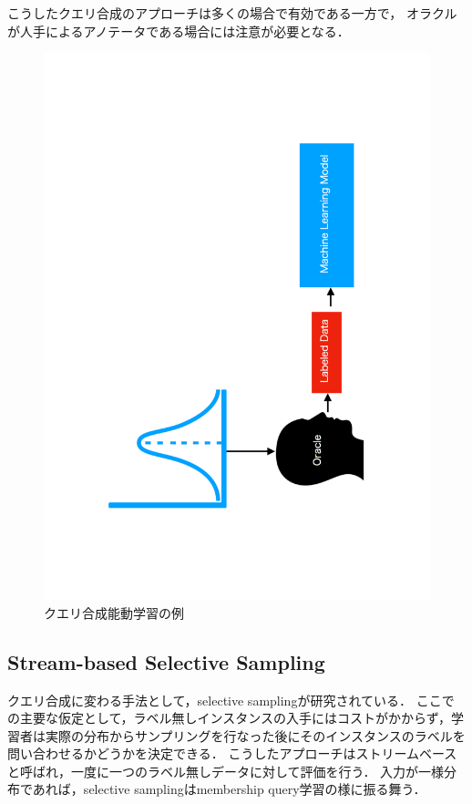 \documentclass[11pt]{report}
\begin{document}
こうしたクエリ合成のアプローチは多くの場合で有効である一方で，
オラクルが人手によるアノテータである場合には注意が必要となる\cite{baum1992query}．

\begin{figure}[h]
\begin{center}
\includegraphics[bb=0 0 500 850, scale=0.4, angle=270]{./images/fig3.pdf}
\vspace{5mm}
\caption{クエリ合成能動学習の例}
\label{fig3}
\end{center}
\end{figure}

\subsection{Stream-based Selective Sampling}
クエリ合成に変わる手法として，selective sampling\cite{atlas1990training}が研究されている．
ここでの主要な仮定として，ラベル無しインスタンスの入手にはコストがかからず，学習者は実際の分布からサンプリングを行なった後にそのインスタンスのラベルを問い合わせるかどうかを決定できる．
こうしたアプローチはストリームベースと呼ばれ，一度に一つのラベル無しデータに対して評価を行う．
入力が一様分布であれば，selective samplingはmembership query学習の様に振る舞う．
\end{document}

